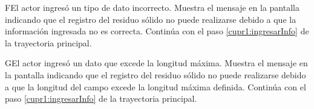     \begin{UCtrayectoriaA}{F}{El actor ingresó un tipo de dato incorrecto.}    
    \UCpaso[\UCsist] Muestra el mensaje  en la pantalla  indicando que el registro del residuo sólido no puede realizarse debido a que la información ingresada no es correcta.
    \UCpaso[] Continúa con el paso \ref{cupr1:ingresarInfo} de la trayectoria principal.     
    \end{UCtrayectoriaA}
    
            \begin{UCtrayectoriaA}{G}{El actor ingresó un dato que excede la longitud máxima.}    
    \UCpaso[\UCsist] Muestra el mensaje  en la pantalla  indicando que el registro del residuo sólido no puede realizarse debido a que la longitud del campo excede la longitud máxima definida.
    \UCpaso[] Continúa con el paso \ref{cupr1:ingresarInfo} de la trayectoria principal.     
    \end{UCtrayectoriaA}
